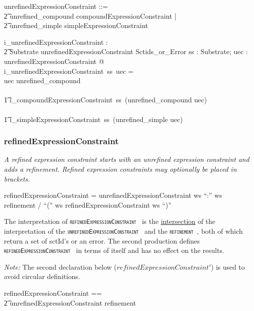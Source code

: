 \documentclass{article}
\def\spec#1{{\tt \small \textsc{{#1}} }}
\def\bnf#1{{\scriptsize {{#1}} }}
\def\desc#1{{\small \textsl{{#1}} }}
\begin{document}
\begin{zed}
unrefinedExpressionConstraint ::= \\
\t2 unrefined\_compound \ldata compoundExpressionConstraint \rdata | \\
\t2 unrefined\_simple \ldata simpleExpressionConstraint \rdata
\end{zed}
\begin{axdef}
   i\_unrefinedExpressionConstraint : \\
\t2 Substrate \fun unrefinedExpressionConstraint \fun Sctids\_or\_Error
\where
   \forall ss : Substrate; uec : unrefinedExpressionConstraint @  \\
   i\_unrefinedExpressionConstraint~ss~uec = \\
   \IF uec \in \ran unrefined\_compound \\
 \THEN \\
 \t1 i\_compoundExpressionConstraint~ss~(unrefined\_compound \inv uec) \\
\ELSE  \\
\t1 i\_simpleExpressionConstraint~ss~(unrefined\_simple \inv uec) 
\end{axdef}

\subsubsection{refinedExpressionConstraint}
\begin{framed}
\desc{A refined expression constraint starts with an unrefined expression constraint and adds a refinement. Refined expression constraints may optionally be placed in brackets.}
\end{framed}
\begin{framed}
\noindent
\bnf{refinedExpressionConstraint = unrefinedExpressionConstraint ws ``:'' ws refinement / ``('' ws refinedExpressionConstraint ws ``)''}
\end{framed}

The interpretation of \spec{refinedExpressionConstraint} is the \underline{intersection} of the interpretation of
the \spec{unrefinedExpressionConstraint} and the \spec{refinement}, both of which return a set of sctId's or
an error.  The second production defines \spec{refinedExpressionConstraint} in terms of itself and has no effect on the results.

\textit{Note:} The second declaration below ($refinedExpressionConstraint'$) is used to avoid circular definitions.

\begin{zed}
refinedExpressionConstraint == \\
\t2 unrefinedExpressionConstraint \cross refinement \\
[refinedExpressionConstraint']
\end{zed}
\end{document}
